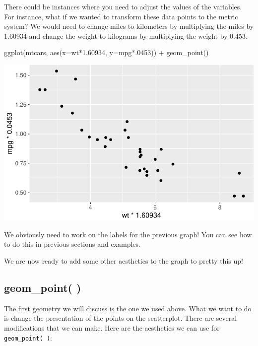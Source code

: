 \documentclass[
  letterpaper,
  DIV=11,
  numbers=noendperiod]{scrreprt}
\newenvironment{Shaded}{\begin{snugshade}}{\end{snugshade}}
\newcommand{\AttributeTok}[1]{\textcolor[rgb]{0.40,0.45,0.13}{#1}}
\newcommand{\DecValTok}[1]{\textcolor[rgb]{0.68,0.00,0.00}{#1}}
\newcommand{\FloatTok}[1]{\textcolor[rgb]{0.68,0.00,0.00}{#1}}
\newcommand{\FunctionTok}[1]{\textcolor[rgb]{0.28,0.35,0.67}{#1}}
\newcommand{\NormalTok}[1]{\textcolor[rgb]{0.00,0.23,0.31}{#1}}
\newcommand{\SpecialCharTok}[1]{\textcolor[rgb]{0.37,0.37,0.37}{#1}}
\begin{document}
There could be instances where you need to adjust the values of the
variables. For instance, what if we wanted to transform these data
points to the metric system? We would need to change miles to kilometers
by multiplying the miles by 1.60934 and change the weight to kilograms
by multiplying the weight by 0.453.

\begin{Shaded}
\begin{Highlighting}[]
\FunctionTok{ggplot}\NormalTok{(mtcars, }\FunctionTok{aes}\NormalTok{(}\AttributeTok{x=}\NormalTok{wt}\SpecialCharTok{*}\FloatTok{1.60934}\NormalTok{, }\AttributeTok{y=}\NormalTok{mpg}\SpecialCharTok{*}\NormalTok{.}\DecValTok{0453}\NormalTok{)) }\SpecialCharTok{+}
  \FunctionTok{geom\_point}\NormalTok{() }
\end{Highlighting}
\end{Shaded}

\includegraphics{Advanced_Scatterplot_Techniques_files/figure-pdf/unnamed-chunk-4-1.pdf}

We obviously need to work on the labels for the previous graph! You can
see how to do this in previous sections and examples.

We are now ready to add some other aesthetics to the graph to pretty
this up!

\subsection*{geom\_point( )}\label{geom_point}

The first geometry we will discuss is the one we used above. What we
want to do is change the presentation of the points on the scatterplot.
There are several modifications that we can make. Here are the
aesthetics we can use for \texttt{geom\_point(\ )}:
\end{document}
